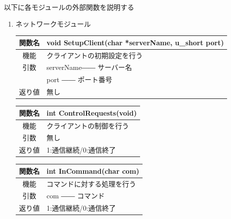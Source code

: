 \documentclass{jarticle}
\begin{document}
以下に各モジュールの外部関数を説明する
\begin{enumerate}
    \item ネットワークモジュール
    \begin{table}[h]
        \label{table:fanc_c1-1}
        \begin{center}
            \begin{tabular}{|c||p{30em}|}\hline
                関数名&void SetupClient(char *serverName, u\_short port) \\\hline
                機能&クライアントの初期設定を行う\\
                引数&serverName―― サーバー名\\
                &port ―― ポート番号\\
                返り値&無し\\\hline
            \end{tabular}
        \end{center}
    \end{table}
    \begin{table}[h]
        \label{table:fanc_c1-2}
        \begin{center}
            \begin{tabular}{|c||p{30em}|}\hline
                関数名&int ControlRequests(void) \\\hline
                機能&クライアントの制御を行う\\
                引数&無し\\
                返り値&1:通信継続/0:通信終了\\\hline
            \end{tabular}
        \end{center}
    \end{table}
    \begin{table}[h]
        \label{table:fanc_c1-3}
        \begin{center}
            \begin{tabular}{|c||p{30em}|}\hline
                関数名&int InCommand(char com) \\\hline
                機能&コマンドに対する処理を行う\\
                引数&com ―― コマンド\\
                返り値&1:通信継続/0:通信終了\\\hline
            \end{tabular}
        \end{center}
    \end{table}

\end{enumerate}
\end{document}

